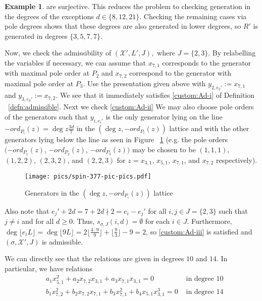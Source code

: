 \documentclass{amsart}
\theoremstyle{plain}
\theoremstyle{definition}
\newtheorem{example}[thm]{Example}
\theoremstyle{remark}
\numberwithin{equation}{section}
\newcommand\sx{\mathscr X}
\newcommand{\halfcan}{L}
\begin{document}
\begin{example}
\noindent
are surjective. This reduces the problem to checking generation
in the degrees of the exceptions $d \in \{8, 12, 21\}$.
Checking the remaining cases via pole degrees shows that
these degrees are also generated in lower degrees,
so $R'$ is generated in degrees $\{3, 5, 7, 7\}$.

Now, we check the admissibility of $(\sx', L' ,J),$ where $J = \{2, 3\}$. By relabelling the
variables if necessary, we can assume that $x_{7, 1}$ corresponds
to the generator with maximal pole order at $P_2$ and $x_{7, 2}$
correspond to the generator with maximal pole order at $P_3$. Use
the presentation given above with $y _{2, e_2'} := x_{7, 1}$ and
$y_{3, e_3'} :=  x_{7, 2}$. We see that it immediately satisfies
\ref{custom:Ad-i} of Definition ~\ref{defn:admissible}. Next we check \ref{custom:Ad-ii} We may also choose
pole orders of the generators such that $y_{i, e_i'}$ is the only
generator lying on the line $-ord_{P_i}(z) = \deg z \frac{3d}{7}$
in the $(\deg z, -ord_{P_i}(z))$  lattice and with the other
generators lying below the line as seen in Figure ~\ref{fig:377}
(e.g. the pole orders $(-ord_{P_1}(z)$, $-ord_{P_2}(z)$, $-ord_{P_3}
(z))$ may be chosen to be $(1, 1, 1)$, $(1, 2, 2)$, $(2, 3, 2)$,
and $(2, 2, 3)$ for $z = x_{3, 1}$, $x_{5, 1}$, $x_{7, 1}$, and
$x_{7, 2}$ respectively).

\begin{figure}[H]
\texttt{[image: pics/spin-377-pic-pics.pdf]} \\
\caption{Generators in the $(\deg z, -ord_{P_i}(z))$ lattice}
\label{fig:377}
\end{figure}

Also note that $e_j' + 2d = 7 + 2d \nmid 2 = e_i - e_j'$ for all
$i, j \in J = \{2, 3\}$ such that $j \neq i$ and for all $d \geq
0$. Thus, $s_{\sigma, J}(i, d) = \emptyset$ for each $i \in J$.
Furthermore, $\deg \lfloor e_i \halfcan \rfloor = \deg \lfloor 9
\halfcan \rfloor = 2 \lfloor \frac{4 \cdot 9}{9} \rfloor + \lfloor
\frac{9}{3} \rfloor - 9 = 2$, so \ref{custom:Ad-iii} is satisfied and
$(\sigma, \sx', J)$ is admissible.


We can directly see that the relations are given in degrees $10$
and $14$. In particular, we have relations
\begin{align*}
	&a_1 x_{5, 1}^2 + a_2 x_{7, 2} x_{3, 1} + a_3 x_{7, 1} x_{3, 1} = 
	0 &\text{ in degree $10$} \\
	&b_1 x_{7, 2}^2 + b_2 x_{7, 2} x_{7, 1} + b_3 x_{7, 1}^2
	+ b_4 x_{5, 1} x_{3, 1}^3 = 0  &\text{ in degree $14$}
\end{align*}


\end{example}
\end{document}
